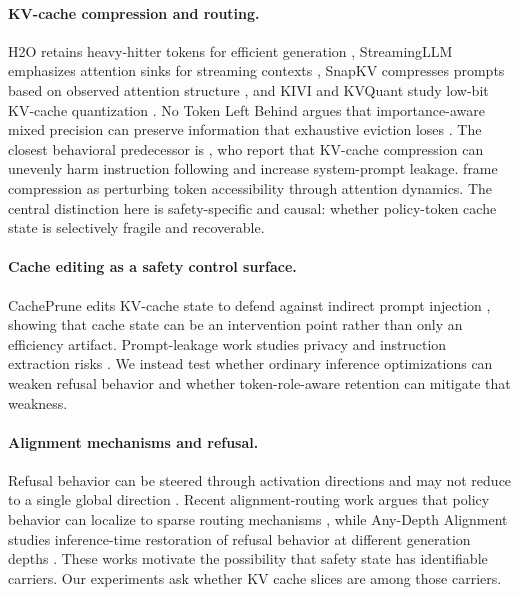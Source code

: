\documentclass[11pt]{article}
\begin{document}
\paragraph{KV-cache compression and routing.}
H2O retains heavy-hitter tokens for efficient generation \citep{zhang2023h2o}, StreamingLLM emphasizes attention sinks for streaming contexts \citep{xiao2024streamingllm}, SnapKV compresses prompts based on observed attention structure \citep{li2024snapkv}, and KIVI and KVQuant study low-bit KV-cache quantization \citep{liu2024kivi,hooper2024kvquant}. No Token Left Behind argues that importance-aware mixed precision can preserve information that exhaustive eviction loses \citep{yang2024notoken}. The closest behavioral predecessor is \citet{chen2025pitfalls}, who report that KV-cache compression can unevenly harm instruction following and increase system-prompt leakage. \citet{ananthanarayanan2026physics} frame compression as perturbing token accessibility through attention dynamics. The central distinction here is safety-specific and causal: whether policy-token cache state is selectively fragile and recoverable.

\paragraph{Cache editing as a safety control surface.}
CachePrune edits KV-cache state to defend against indirect prompt injection \citep{wang2025cacheprune}, showing that cache state can be an intervention point rather than only an efficiency artifact. Prompt-leakage work studies privacy and instruction extraction risks \citep{hui2024pleak}. We instead test whether ordinary inference optimizations can weaken refusal behavior and whether token-role-aware retention can mitigate that weakness.

\paragraph{Alignment mechanisms and refusal.}
Refusal behavior can be steered through activation directions and may not reduce to a single global direction \citep{arditi2024refusal,joad2026more_refusal}. Recent alignment-routing work argues that policy behavior can localize to sparse routing mechanisms \citep{frank2026alignmentroutes}, while Any-Depth Alignment studies inference-time restoration of refusal behavior at different generation depths \citep{zhang2026anydepth}. These works motivate the possibility that safety state has identifiable carriers. Our experiments ask whether KV cache slices are among those carriers.
\end{document}

